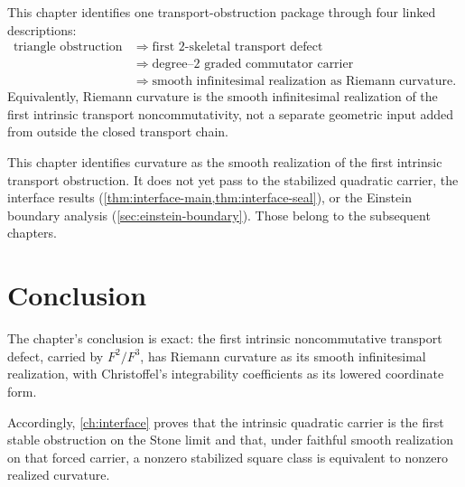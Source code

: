 \begin{remark}
	This chapter identifies one transport-obstruction package through four
	linked descriptions:
	\[
		\begin{split}
			\text{triangle obstruction}
				 & \Longrightarrow \text{first \(2\)-skeletal transport defect}       \\
				 & \Longrightarrow \text{degree--\(2\) graded commutator carrier}     \\
				 & \Longrightarrow \text{smooth infinitesimal realization as Riemann curvature}.
		\end{split}
	\]
	Equivalently, Riemann curvature is the smooth infinitesimal
	realization of the first intrinsic transport noncommutativity, not a
	separate geometric input added from outside the closed transport
	chain.
\end{remark}
\begin{remark}
	This chapter identifies curvature as the smooth realization of the
	first intrinsic transport obstruction.  It does not yet pass to the
	stabilized quadratic carrier, the interface results
	(\cref{thm:interface-main,thm:interface-seal}), or the Einstein
	boundary analysis (\cref{sec:einstein-boundary}).  Those belong to the
	subsequent chapters.
\end{remark}

\section{Conclusion}
\label{sec:christoffel-conclusion}
The chapter's conclusion is exact: the first intrinsic noncommutative
transport defect, carried by \(F^2/F^3\), has Riemann curvature as its
smooth infinitesimal realization, with Christoffel's integrability
coefficients as its lowered coordinate form.

Accordingly, \cref{ch:interface} proves that the intrinsic quadratic
carrier is the first stable obstruction on the Stone limit and that,
under faithful smooth realization on that forced carrier, a nonzero
stabilized square class is equivalent to nonzero realized curvature.

\begin{chapterclosing}
\end{chapterclosing}
